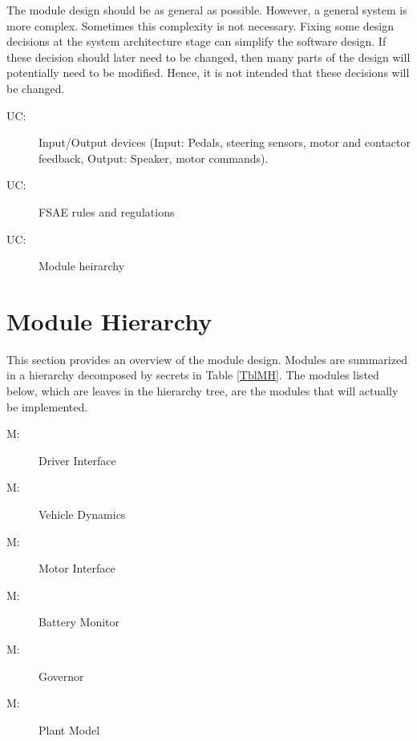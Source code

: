 \documentclass[12pt, titlepage]{article}
\newcounter{ucnum}
\newcommand{\uctheucnum}{UC\theucnum}
\newcounter{mnum}
\newcommand{\mthemnum}{M\themnum}
\begin{document}
The module design should be as general as possible. However, a general system is
more complex. Sometimes this complexity is not necessary. Fixing some design
decisions at the system architecture stage can simplify the software design. If
these decision should later need to be changed, then many parts of the design
will potentially need to be modified. Hence, it is not intended that these
decisions will be changed.

\begin{description}
\item[ \uctheucnum \label{ucIO}:] Input/Output devices
  (Input: Pedals, steering sensors, motor and contactor feedback, Output: Speaker, motor commands).
\item[ \uctheucnum \label{ucFSAE}:] FSAE rules and regulations
\item[ \uctheucnum \label{ucModules}:] Module heirarchy
\end{description}

\section{Module Hierarchy} \label{SecMH}

This section provides an overview of the module design. Modules are summarized
in a hierarchy decomposed by secrets in Table \ref{TblMH}. The modules listed
below, which are leaves in the hierarchy tree, are the modules that will
actually be implemented.

\begin{description}
\item [ \mthemnum \label{mDI}:] Driver Interface
\item [ \mthemnum \label{mVD}:] Vehicle Dynamics
\item [ \mthemnum \label{mMI}:] Motor Interface
\item [ \mthemnum \label{mBM}:] Battery Monitor
\item [ \mthemnum \label{mG}:] Governor
\item [ \mthemnum \label{mPlant}:] Plant Model
\end{description}
\end{document}

